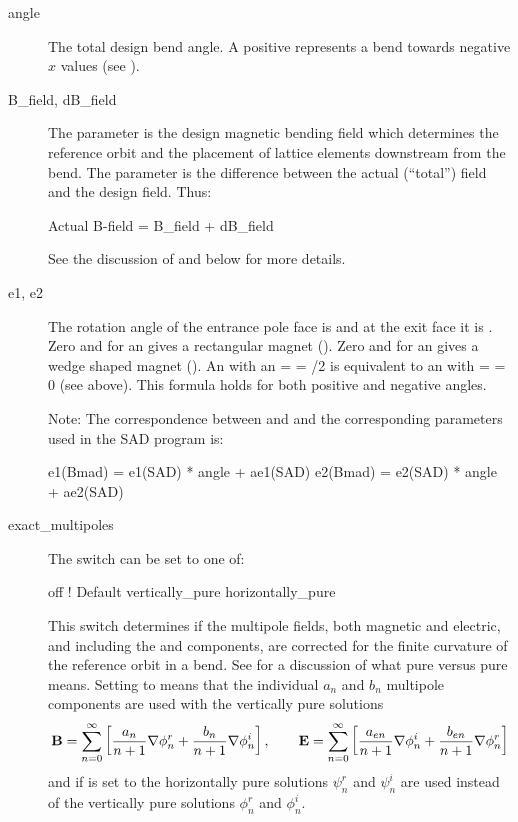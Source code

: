   \begin{description}
  \item[angle] \Newline
The total design bend angle. A positive  represents a
bend towards negative $x$ values (see ).
  \item[B_field, dB_field] \Newline
The  parameter is the design magnetic bending field which determines the reference orbit
and the placement of lattice elements downstream from the bend. The  parameter is
the difference between the actual (``total'') field and the design field. Thus:
\begin{example}
  Actual B-field = B_field + dB_field
\end{example}
See the discussion of  and  below for more details.
  \item[e1, e2] \Newline
The rotation angle of the entrance pole face is  and at the exit face it is . Zero
 and  for an  gives a rectangular magnet (). Zero 
and  for an  gives a wedge shaped magnet ().  An  with
an  =  = /2 is equivalent to an  with  =  = 0 (see
above).  This formula holds for both positive and negative angles.

Note: The correspondence between  and  and the corresponding parameters used in the
SAD program \cite{b:sad} is:
\begin{example}
  e1(Bmad) =  e1(SAD) * angle + ae1(SAD)
  e2(Bmad) =  e2(SAD) * angle + ae2(SAD)
\end{example}
  \item[exact_multipoles] \Newline
The  switch can be set to one of:
\begin{example}
  off                 ! Default
  vertically_pure    
  horizontally_pure  
\end{example}
This switch determines if the multipole fields, both magnetic and electric, and including the
 and  components, are corrected for the finite curvature of the reference orbit in a
bend. See  for a discussion of what  pure versus
 pure means. Setting  to  means that the
individual $a_n$ and $b_n$ multipole components are used with the vertically pure solutions
\begin{equation}
  {\bf B} = \sum_{n = 0}^\infty \left[ \frac{a_n}{n+1} \nabla \phi_n^r + \frac{b_n}{n+1} \nabla \phi_n^i \right], \qquad
  {\bf E} = \sum_{n = 0}^\infty \left[ \frac{a_{en}}{n+1} \nabla \phi_n^i + \frac{b_{en}}{n+1} \nabla \phi_n^r \right]
\end{equation}
and if  is set to  the horizontally pure solutions
$\psi_n^r$ and $\psi_n^i$ are used instead of the vertically pure solutions $\phi_n^r$ and
$\phi_n^i$.


\end{description}
